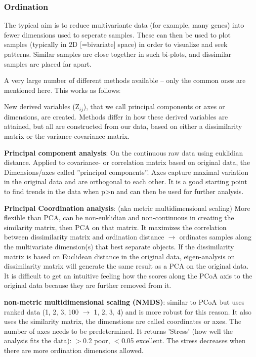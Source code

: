 \documentclass{article}
\begin{document}
\subsubsection{Ordination}
The typical aim is to reduce multivariante data (for example, many genes) into fewer dimensions used to seperate samples. These can then be used to plot samples (typically in 2D [=bivariate] space) in order to visualize and seek patterns. Similar samples are close together in such bi-plots, and dissimilar samples are placed far apart. \par
A very large number of different methods available – only the common ones are mentioned here.
This works as follows:\par 
New derived variables (Z$_{ij}$), that we call principal components or axes or dimensions, are created. Methods differ in how these derived variables are attained, but all are constructed from our data, based on either a dissimilarity matrix or the variance-covariance matrix.\par
\textbf{Principal component analysis}: On the continuous raw data using euklidian distance. Applied to covariance- or correlation matrix based on original data, the Dimensions/axes called ”principal components”. Axes capture maximal variation in the original data and are orthogonal to each other.
It is a good starting point to find trends in the data when p>n and can then be used for further analysis.\par
\textbf{Principal Coordination analysis}: (aka metric multidimensional scaling) More flexible than PCA, can be non-euklidian and non-continuous in creating the similarity matrix, then PCA on that matrix. It maximizes the correlation between dissimilarity matrix and ordination distance $\rightarrow$ ordinates samples along the multivariate dimension(s) that best separate objects. If the dissimilarity matrix is based on Euclidean distance in the original data, eigen-analysis on dissimilarity matrix will generate the same result as a PCA on the original data. It is difficult to get an intuitive feeling how the scores along the PCoA axis to the original data because they are further removed from it.\par
\textbf{non-metric multidimensional scaling (NMDS)}: similar to PCoA but uses ranked data (1, 2, 3, 100 $\rightarrow$ 1, 2, 3, 4) and is more robust for this reason. It also uses the similarity matrix, the dimenstions are called coordinates or axes. The number of axes needs to be predetermined. It returns 'Stress' (how well the analysis fits the data): $>$0.2 poor, $<$0.05 excellent. The stress decreases when there are more ordination dimensions allowed.\par
\end{document}
